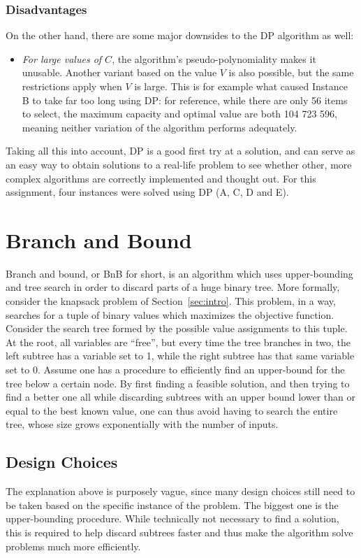 \documentclass[journal]{IEEEtran}
\begin{document}
\subsubsection{Disadvantages}
On the other hand, there are some major downsides to the DP algorithm as well:
\begin{itemize}
	\item \emph{For large values of \(C\)}, the algorithm's pseudo-polynomiality makes it unusable.
	Another variant based on the value \(V\) is also possible, but the same restrictions apply when \(V\) is large.
	This is for example what caused Instance B to take far too long using DP: for reference, while there are only 56 items to select, the maximum capacity and optimal value are both 104 723 596, meaning neither variation of the algorithm performs adequately.
\end{itemize}
Taking all this into account, DP is a good first try at a solution, and can serve as an easy way to obtain solutions to a real-life problem to see whether other, more complex algorithms are correctly implemented and thought out.
For this assignment, four instances were solved using DP (A, C, D and E).

\section{Branch and Bound}
Branch and bound, or BnB for short, is an algorithm which uses upper-bounding and tree search in order to discard parts of a huge binary  tree.
More formally, consider the knapsack problem of Section~\ref{sec:intro}.
This problem, in a way, searches for a tuple of binary values which maximizes the objective function.
Consider the search tree formed by the possible value assignments to this tuple.
At the root, all variables are ``free'', but every time the tree branches in two, the left subtree has a variable set to 1, while the right subtree has that same variable set to 0.
Assume one has a procedure to efficiently find an upper-bound for the tree below a certain node.
By first finding a feasible solution, and then trying to find a better one all while discarding subtrees with an upper bound lower than or equal to the best known value, one can thus avoid having to search the entire tree, whose size grows exponentially with the number of inputs.

\subsection{Design Choices}
The explanation above is purposely vague, since many design choices still need to be taken based on the specific instance of the problem.
The biggest one is the upper-bounding procedure.
While technically not necessary to find a solution, this is required to help discard subtrees faster and thus make the algorithm solve problems much more efficiently.
\end{document}
